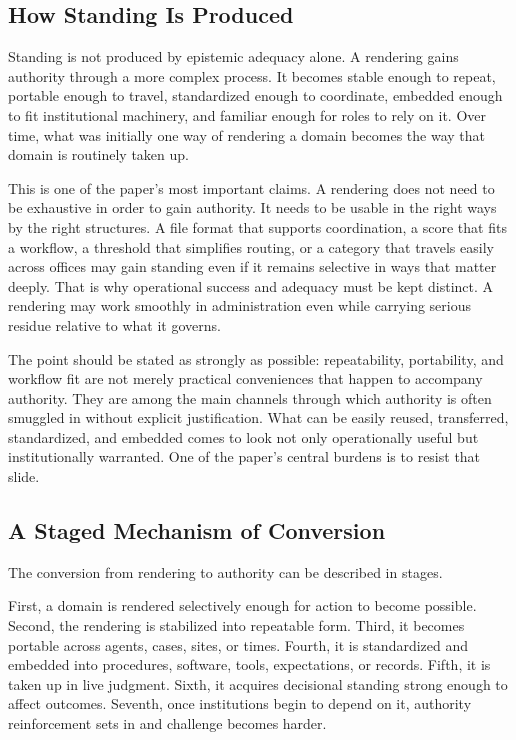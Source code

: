 \documentclass[11pt]{article}
\begin{document}
\subsection{How Standing Is Produced}

Standing is not produced by epistemic adequacy alone. A rendering gains authority through a more complex process. It becomes stable enough to repeat, portable enough to travel, standardized enough to coordinate, embedded enough to fit institutional machinery, and familiar enough for roles to rely on it. Over time, what was initially one way of rendering a domain becomes the way that domain is routinely taken up.\cite{TimmermansEpstein2010WorldOfStandards,EspelandStevens1998Commensuration,Porter1995TrustInNumbers,BowkerStar1999SortingThingsOut}

This is one of the paper's most important claims. A rendering does not need to be exhaustive in order to gain authority. It needs to be usable in the right ways by the right structures. A file format that supports coordination, a score that fits a workflow, a threshold that simplifies routing, or a category that travels easily across offices may gain standing even if it remains selective in ways that matter deeply. That is why operational success and adequacy must be kept distinct. A rendering may work smoothly in administration even while carrying serious residue relative to what it governs.

The point should be stated as strongly as possible: repeatability, portability, and workflow fit are not merely practical conveniences that happen to accompany authority. They are among the main channels through which authority is often smuggled in without explicit justification. What can be easily reused, transferred, standardized, and embedded comes to look not only operationally useful but institutionally warranted. One of the paper's central burdens is to resist that slide.

\subsection{A Staged Mechanism of Conversion}

The conversion from rendering to authority can be described in stages.

First, a domain is rendered selectively enough for action to become possible. Second, the rendering is stabilized into repeatable form. Third, it becomes portable across agents, cases, sites, or times. Fourth, it is standardized and embedded into procedures, software, tools, expectations, or records. Fifth, it is taken up in live judgment. Sixth, it acquires decisional standing strong enough to affect outcomes. Seventh, once institutions begin to depend on it, authority reinforcement sets in and challenge becomes harder.\cite{BowkerStar1999SortingThingsOut,TimmermansEpstein2010WorldOfStandards,Power1997AuditSociety}
\end{document}
